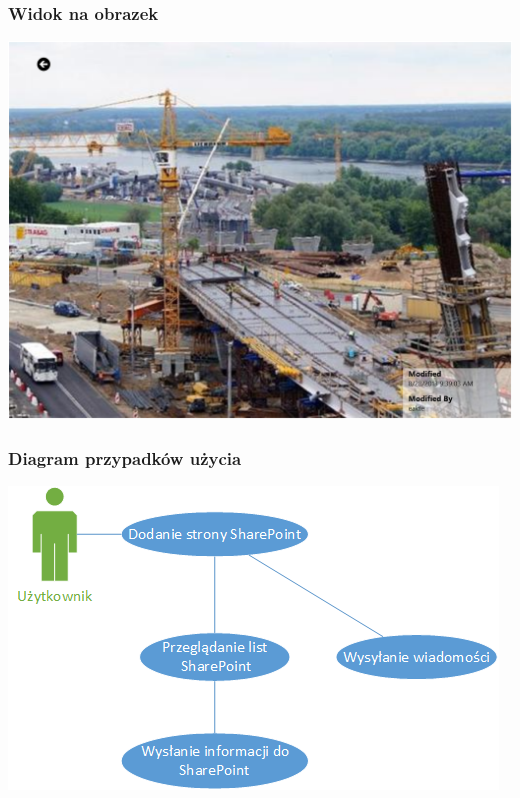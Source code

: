 \begin{frame}[fragile]
\frametitle{Widok na obrazek}
\includegraphics[width=\textwidth]{app_picture}
\end{frame}


\begin{frame}[fragile]
\frametitle{Diagram przypadków użycia}
\includegraphics[scale=0.5]{example_usecase}
\end{frame}

